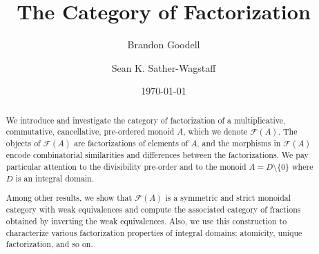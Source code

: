 \documentclass[reqno]{amsart}
\theoremstyle{plain}
\theoremstyle{definition}
\numberwithin{equation}{lem}
\begin{document}
\author{Brandon Goodell}
\address{Department of Mathematical Sciences\\
	Clemson University\\
O-110 Martin Hall, Box 340975, Clemson, S.C. 29634, USA}

\author{Sean K. Sather-Wagstaff}





\date{\today}


\title{The Category of Factorization}
\begin{abstract}
We introduce and investigate the category of factorization of a multiplicative, commutative, cancellative, pre-ordered monoid $A$, which we denote $\mathcal{F}(A)$. The objects of $\mathcal{F}(A)$ are factorizations of elements of $A$, and the morphisms in $\mathcal{F}(A)$ encode combinatorial similarities and differences between the factorizations. We pay particular attention to the divisibility pre-order and to the monoid $A=D\setminus\{0\}$ where $D$ is an integral domain.

Among other results, we show that $\mathcal{F}(A)$ is a symmetric and strict monoidal category with weak equivalences and compute the associated category of fractions obtained by inverting the weak equivalences. Also, we use this construction to characterize various factorization properties of integral domains: atomicity, unique factorization, and so on.
\end{abstract}
\end{document}
